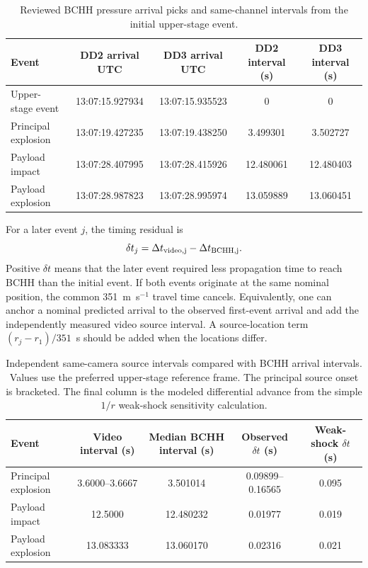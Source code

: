 \documentclass[]{seismica}
\begin{document}
\begin{table}[!tbp]
\centering
\caption{Reviewed BCHH pressure arrival picks and same-channel intervals from
the initial upper-stage event.}
\label{tab:supp_receiver_picks}
\begin{tabularx}{\textwidth}{Xcccc}
\hline
Event & DD2 arrival UTC & DD3 arrival UTC & DD2 interval (s) & DD3 interval (s) \\
\hline
Upper-stage event & 13:07:15.927934 & 13:07:15.935523 & 0 & 0 \\
Principal explosion & 13:07:19.427235 & 13:07:19.438250 & 3.499301 & 3.502727 \\
Payload impact & 13:07:28.407995 & 13:07:28.415926 & 12.480061 & 12.480403 \\
Payload explosion & 13:07:28.987823 & 13:07:28.995974 & 13.059889 & 13.060451 \\
\hline
\end{tabularx}
\end{table}

For a later event $j$, the timing residual is
\begin{equation}
 \delta t_j=\Delta t_{\rm video,j}-\Delta t_{\rm BCHH,j}.
\end{equation}
Positive $\delta t$ means that the later event required less propagation time
to reach BCHH than the initial event. If both events originate at the same
nominal position, the common 351~m~s$^{-1}$ travel time cancels. Equivalently,
one can anchor a nominal predicted arrival to the observed first-event arrival
and add the independently measured video source interval. A source-location
term $(r_j-r_1)/351$~s should be added when the locations differ.

\begin{table}[!tbp]
\centering
\caption{Independent same-camera source intervals compared with BCHH arrival
intervals. Values use the preferred upper-stage reference frame. The principal
source onset is bracketed. The final column is the modeled differential advance
from the simple $1/r$ weak-shock sensitivity calculation.}
\label{tab:supp_timing_comparison}
\begin{tabularx}{\textwidth}{Xcccc}
\hline
Event & Video interval (s) & Median BCHH interval (s) & Observed $\delta t$ (s) & Weak-shock $\delta t$ (s) \\
\hline
Principal explosion & 3.6000--3.6667 & 3.501014 & 0.09899--0.16565 & 0.095 \\
Payload impact & 12.5000 & 12.480232 & 0.01977 & 0.019 \\
Payload explosion & 13.083333 & 13.060170 & 0.02316 & 0.021 \\
\hline
\end{tabularx}
\end{table}
\end{document}
